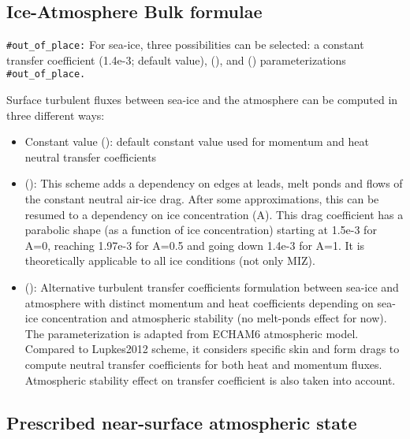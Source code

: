 \documentclass[../main/NEMO_manual]{subfiles}
\begin{document}
\subsection{Ice-Atmosphere Bulk formulae}
\label{subsec:SBC_blk_ice}

\texttt{\#out\_of\_place:}
 For sea-ice, three possibilities can be selected:
a constant transfer coefficient (1.4e-3; default
value), \citet{lupkes.gryanik.ea_JGRA12} (),
and \citet{lupkes.gryanik_JGR15} () parameterizations
\texttt{\#out\_of\_place.}

Surface turbulent fluxes between sea-ice and the atmosphere can be computed in three different ways:

\begin{itemize}
\item Constant value ():
  default constant value used for momentum and heat neutral transfer coefficients
\item \citet{lupkes.gryanik.ea_JGRA12} ():
  This scheme adds a dependency on edges at leads, melt ponds and flows
  of the constant neutral air-ice drag. After some approximations,
  this can be resumed to a dependency on ice concentration (A).
  This drag coefficient has a parabolic shape (as a function of ice concentration)
  starting at 1.5e-3 for A=0, reaching 1.97e-3 for A=0.5 and going down 1.4e-3 for A=1.
  It is theoretically applicable to all ice conditions (not only MIZ).
\item \citet{lupkes.gryanik_JGR15} ():
  Alternative turbulent transfer coefficients formulation between sea-ice
  and atmosphere with distinct momentum and heat coefficients depending
  on sea-ice concentration and atmospheric stability (no melt-ponds effect for now).
  The parameterization is adapted from ECHAM6 atmospheric model.
  Compared to Lupkes2012 scheme, it considers specific skin and form drags
  to compute neutral transfer coefficients for both heat and momentum fluxes.
  Atmospheric stability effect on transfer coefficient is also taken into account.
\end{itemize}

\subsection{Prescribed near-surface atmospheric state}
\end{document}
